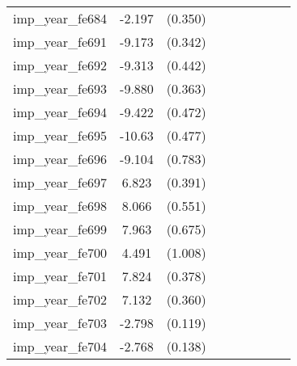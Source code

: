 {\begin{tabular}{l*{4}{cc}}
imp\_year\_fe684&   -2.197\sym{***}&  (0.350)&                  &         &                  &         &                  &         \\
imp\_year\_fe691&   -9.173\sym{***}&  (0.342)&                  &         &                  &         &                  &         \\
imp\_year\_fe692&   -9.313\sym{***}&  (0.442)&                  &         &                  &         &                  &         \\
imp\_year\_fe693&   -9.880\sym{***}&  (0.363)&                  &         &                  &         &                  &         \\
imp\_year\_fe694&   -9.422\sym{***}&  (0.472)&                  &         &                  &         &                  &         \\
imp\_year\_fe695&   -10.63\sym{***}&  (0.477)&                  &         &                  &         &                  &         \\
imp\_year\_fe696&   -9.104\sym{***}&  (0.783)&                  &         &                  &         &                  &         \\
imp\_year\_fe697&    6.823\sym{***}&  (0.391)&                  &         &                  &         &                  &         \\
imp\_year\_fe698&    8.066\sym{***}&  (0.551)&                  &         &                  &         &                  &         \\
imp\_year\_fe699&    7.963\sym{***}&  (0.675)&                  &         &                  &         &                  &         \\
imp\_year\_fe700&    4.491\sym{***}&  (1.008)&                  &         &                  &         &                  &         \\
imp\_year\_fe701&    7.824\sym{***}&  (0.378)&                  &         &                  &         &                  &         \\
imp\_year\_fe702&    7.132\sym{***}&  (0.360)&                  &         &                  &         &                  &         \\
imp\_year\_fe703&   -2.798\sym{***}&  (0.119)&                  &         &                  &         &                  &         \\
imp\_year\_fe704&   -2.768\sym{***}&  (0.138)&                  &         &                  &         &                  &         \\

\end{tabular}}

